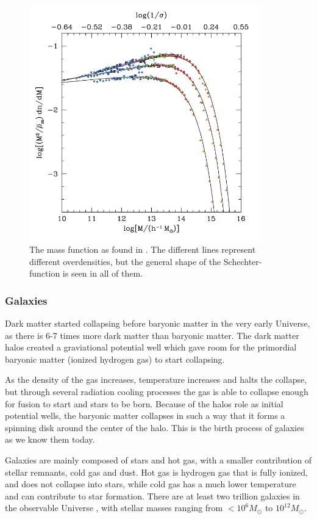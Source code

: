 \begin{figure}
    \centering
    \includegraphics[width=0.9\textwidth]{images/halo_mass_function.png}
    \caption{The mass function as found in \cite{Tinker2008}. The different lines represent different overdensities, but the general shape of the Schechter-function is seen in all of them. }
    \label{halo_mass}
\end{figure}

\subsubsection{Galaxies}
Dark matter started collapsing before baryonic matter in the very early Universe, as there is 6-7 times more dark matter than baryonic matter. The dark matter halos created a graviational potential well which gave room for the primordial baryonic matter (ionized hydrogen gas) to start collapsing. 

As the density of the gas increases, temperature increases and halts the collapse, but through several radiation cooling processes the gas is able to collapse enough for fusion to start and stars to be born. Because of the halos role as initial potential wells, the baryonic matter collapses in such a way that it forms a spinning disk around the center of the halo. This is the birth process of galaxies as we know them today.

Galaxies are mainly composed of stars and hot gas, with a smaller contribution of stellar remnants, cold gas and dust. Hot gas is hydrogen gas that is fully ionized, and does not collapse into stars, while cold gas has a much lower temperature and can contribute to star formation. There are at least two trillion galaxies in the observable Universe \parencite{Conselice2016}, with stellar masses ranging from $<10^6 M_{\odot}$ to $10^{12} M_{\odot}$. 

